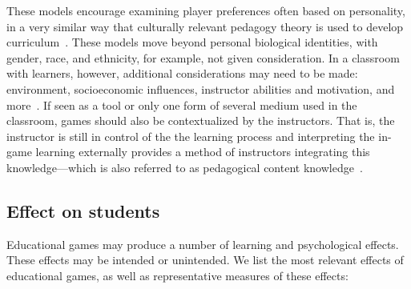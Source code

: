 \documentclass{sig-alternate-05-2015}
\begin{document}
These models encourage examining player preferences often based on personality, in a very similar way that culturally relevant pedagogy theory is used to develop curriculum~\cite{ladson1995toward}. These models move beyond personal biological identities, with gender, race, and ethnicity, for example, not given consideration. In a classroom with learners, however, additional considerations may need to be made: environment, socioeconomic influences, instructor abilities and motivation, and more~\cite{hainey2010using}. If seen as a tool or only one form of several medium used in the classroom, games should also be contextualized by the instructors. That is, the instructor is still in control of the the learning process and interpreting the in-game learning externally provides a method of instructors integrating this knowledge---which is also referred to as pedagogical content knowledge~\cite{shulman86those}.\subsection{Effect on students}


Educational games may produce a number of learning and psychological effects. These effects may be intended or unintended. We list the most relevant effects of educational games, as well as representative measures of these effects:
\end{document}
